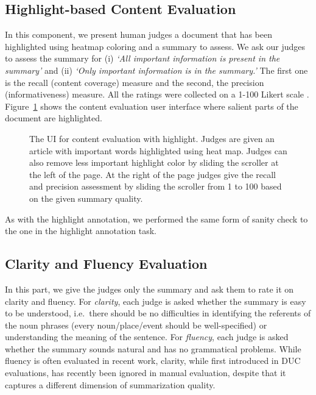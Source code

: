 \documentclass[11pt,a4paper]{article}
\begin{document}
\subsection{Highlight-based Content Evaluation}
In this component, we present human judges a document that has been highlighted using heatmap coloring and a summary to assess.
We ask our judges to assess the summary for (i) \textit{`All important information is present in the summary'} and (ii) \textit{`Only important information is in the summary.'} The first one is the recall (content coverage) measure and the second, the precision (informativeness) measure. All the ratings were collected on a 1-100 Likert scale \citep{Likert1932}. Figure~\ref{image:highlightbasedevaluation} shows the content evaluation user interface where salient parts of the document are highlighted.
%
\begin{figure}[t!]
    \centering
    \caption{The UI for content evaluation with highlight. Judges are given an article with important words highlighted using heat map. Judges can also remove less important highlight color by sliding the scroller at the left of the page. At the right of the page judges give the recall and precision assessment by sliding the scroller from 1 to 100 based on the given summary quality.}
    \label{image:highlightbasedevaluation}
\end{figure}
%
As with the highlight annotation, %
we performed the same form of sanity check to the one in the highlight annotation task.


\subsection{Clarity and Fluency Evaluation}
In this part, we give the judges only the summary and ask them to rate it on clarity and fluency. For {\em clarity}, each judge is asked whether the summary is easy to be understood, i.e.\ 
there should be no difficulties in identifying the referents of the noun phrases (every noun/place/event should be well-specified) or understanding the meaning of the sentence. For {\em fluency}, each judge is asked whether the summary sounds natural and has no grammatical problems. %
While fluency is often evaluated in recent work, clarity, while first introduced in DUC evaluations, has recently been ignored in manual evaluation, despite that it captures a different dimension of summarization quality.
\end{document}
